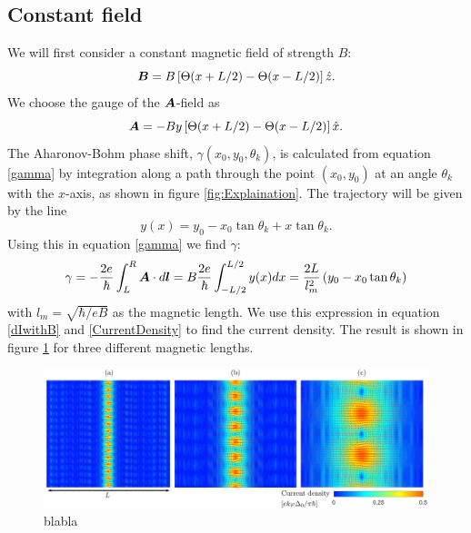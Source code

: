 \subsection{Constant field}
\label{sec:ConstField}
We will first consider a constant magnetic field of strength $B$:
\begin{equation}
    \boldsymbol{B} = B\left[\Theta(x+L/2) - \Theta(x-L/2) \right]\hat{z}.
\end{equation}
We choose the gauge of the $\boldsymbol{A}$-field as
\begin{equation}
    \boldsymbol{A} = -By\left[\Theta(x+L/2) - \Theta(x-L/2) \right]\hat{x}.
\end{equation}
The Aharonov-Bohm phase shift, $\gamma(x_0,y_0,\theta_k)$, is calculated from equation \eqref{gamma} by integration along a path through the point $(x_0,y_0)$ at an angle $\theta_k$ with the $x$-axis, as shown in figure \ref{fig:Explaination}. The trajectory will be given by the line
\begin{equation}
    y(x) = y_0-x_0\tan\theta_k + x\tan\theta_k.
    \label{trajectory}
\end{equation}
Using this in equation \eqref{gamma} we find $\gamma$:
\begin{equation}
    \gamma = -\frac{2e}{\hbar}\int_L^R \boldsymbol{A}\cdot d\boldsymbol{l} = B\frac{2e}{\hbar}\int_{-L/2}^{L/2}y(x)dx = \frac{2L}{l_m^2}\left(y_0 - x_0\tan\theta_k \right)
\label{gamma1}
\end{equation}
with $l_m = \sqrt{\hbar/eB}$ as the magnetic length.
We use this expression in equation \eqref{dIwithB} and \eqref{CurrentDensity} to find the current density. The result is shown in figure \ref{fig:Constant} for three different magnetic lengths. 
\begin{figure}[hhh]
\centering
\includegraphics[width=17cm]{fig/dist1}
\caption{blabla}
\label{fig:Constant}
\end{figure}

